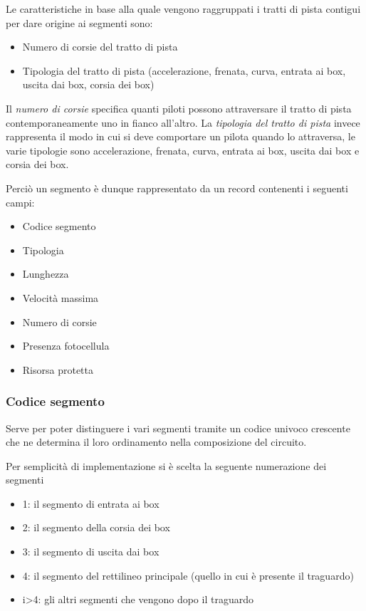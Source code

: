 \documentclass[a4paper,11pt, twoside]{book}
\begin{document}
	Le caratteristiche in base alla quale vengono raggruppati i tratti di pista contigui per dare origine ai segmenti sono:
	\begin{itemize}
	  \item Numero di corsie del tratto di pista
	  \item Tipologia del tratto di pista (accelerazione, frenata, curva, entrata ai box, uscita dai box, corsia dei box)
	\end{itemize}
	
	Il \textsl{numero di corsie} specifica quanti piloti possono attraversare il tratto di pista contemporaneamente uno in 
	fianco all'altro.
	La \textsl{tipologia del tratto di pista} invece rappresenta il modo in cui si deve comportare un pilota quando lo attraversa,
	le varie tipologie sono accelerazione, frenata, curva, entrata ai box, uscita dai box e corsia dei box.
	
	Perciò un segmento è dunque rappresentato da un record contenenti i seguenti campi:
	
	\begin{itemize}
	  \item Codice segmento
	  \item Tipologia
	  \item Lunghezza
	  \item Velocità massima
	  \item Numero di corsie
	  \item Presenza fotocellula
	  \item Risorsa protetta
	\end{itemize}
	
	\subsubsection{Codice segmento}
	  Serve per poter distinguere i vari segmenti tramite un codice univoco crescente che ne determina il loro ordinamento
	  nella composizione del circuito. 

	  Per semplicità di implementazione si è scelta la seguente numerazione dei segmenti
	  \begin{itemize}
	    \item 1: il segmento di entrata ai box
	    \item 2: il segmento della corsia dei box
	    \item 3: il segmento di uscita dai box
	    \item 4: il segmento del rettilineo principale (quello in cui è presente il traguardo)
	    \item i>4: gli altri segmenti che vengono dopo il traguardo
	  \end{itemize}
	  
\end{document}
